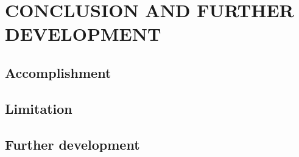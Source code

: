 \chapter{CONCLUSION AND FURTHER DEVELOPMENT}

\section{Accomplishment}
\section{Limitation}
\section{Further development}


